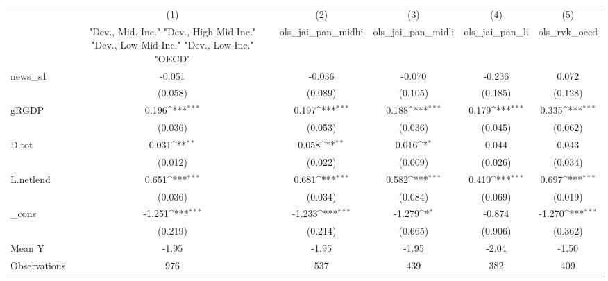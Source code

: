 {
\def\sym#1{\ifmmode^{#1}\else\(^{#1}\)\fi}
\begin{tabular}{l*{5}{c}}
\toprule
            &\multicolumn{1}{c}{(1)}&\multicolumn{1}{c}{(2)}&\multicolumn{1}{c}{(3)}&\multicolumn{1}{c}{(4)}&\multicolumn{1}{c}{(5)}\\
            &\multicolumn{1}{c}{ "Dev., Mid.-Inc." "Dev., High Mid-Inc." "Dev., Low Mid-Inc." "Dev., Low-Inc." "OECD" }&\multicolumn{1}{c}{ols\_jai\_pan\_midhi}&\multicolumn{1}{c}{ols\_jai\_pan\_midli}&\multicolumn{1}{c}{ols\_jai\_pan\_li}&\multicolumn{1}{c}{ols\_rvk\_oecd}\\
\midrule
news\_s1     &      -0.051         &      -0.036         &      -0.070         &      -0.236         &       0.072         \\
            &     (0.058)         &     (0.089)         &     (0.105)         &     (0.185)         &     (0.128)         \\
\addlinespace
gRGDP       &       0.196\sym{***}&       0.197\sym{***}&       0.188\sym{***}&       0.179\sym{***}&       0.335\sym{***}\\
            &     (0.036)         &     (0.053)         &     (0.036)         &     (0.045)         &     (0.062)         \\
\addlinespace
D.tot       &       0.031\sym{**} &       0.058\sym{**} &       0.016\sym{*}  &       0.044         &       0.043         \\
            &     (0.012)         &     (0.022)         &     (0.009)         &     (0.026)         &     (0.034)         \\
\addlinespace
L.netlend   &       0.651\sym{***}&       0.681\sym{***}&       0.582\sym{***}&       0.410\sym{***}&       0.697\sym{***}\\
            &     (0.036)         &     (0.034)         &     (0.084)         &     (0.069)         &     (0.019)         \\
\addlinespace
\_cons      &      -1.251\sym{***}&      -1.233\sym{***}&      -1.279\sym{*}  &      -0.874         &      -1.270\sym{***}\\
            &     (0.219)         &     (0.214)         &     (0.665)         &     (0.906)         &     (0.362)         \\
\midrule
Mean Y      &       -1.95         &       -1.95         &       -1.95         &       -2.04         &       -1.50         \\
Observations&         976         &         537         &         439         &         382         &         409         \\
\bottomrule
\end{tabular}
}
